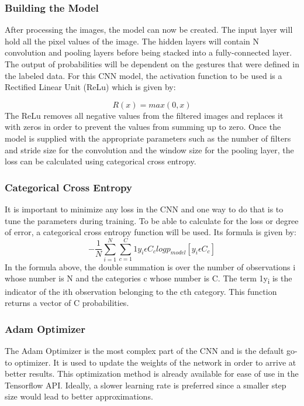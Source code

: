\documentclass[journal]{./IEEE/IEEEtran}
\begin{document}
\subsubsection{Building the Model}
After processing the images, the model can now be created. The input layer will hold all the pixel values of the image. The hidden layers will contain N convolution and pooling layers before being stacked into a fully-connected layer. The output of probabilities will be dependent on the gestures that were defined in the labeled data. For this CNN model, the activation function to be used is a Rectified Linear Unit (ReLu) which is given by:

\begin{equation}
R(x) = max(0,x)
\end{equation}
\indent The ReLu removes all negative values from the filtered images and replaces it with zeros in order to prevent the values from summing up to zero.
\newline
\indent Once the model is supplied with the appropriate parameters such as the number of filters and stride size for the convolution and the window size for the pooling layer, the loss can be calculated using categorical cross entropy.
\newline
\subsubsection{Categorical Cross Entropy}
It is important to minimize any loss in the CNN and one way to do that is to tune the parameters during training. To be able to calculate for the loss or degree of error, a categorical cross entropy function will be used. Its formula is given by:
\begin{equation}
-\frac{1}{N}\sum_{i=1}^{N}\sum_{c=1}^{C}1y_{i}\epsilon C_{c} logp_{model}[y_{i} \epsilon C_{c}]
\end{equation}
\indent In the formula above, the double summation is over the number of observations i whose number is N and the categories c whose number is C. The term 1y\textsubscript{i} is the indicator of the ith observation belonging to the cth category. This function returns a vector of C probabilities.
\newline
\subsubsection{Adam Optimizer}
The Adam Optimizer is the most complex part of the CNN and is the default go-to optimizer. It is used to update the weights of the network in order to arrive at better results. This optimization method is already available for ease of use in the Tensorflow API. Ideally, a slower learning rate is preferred since a smaller step size would lead to better approximations.
\newline
\end{document}
